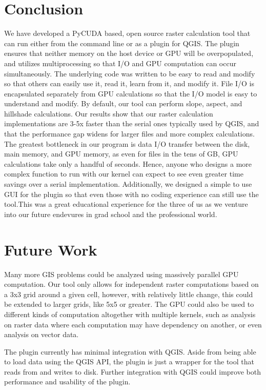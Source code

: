 \documentclass[journal]{IEEEtran}
\begin{document}
\section{Conclusion}
We have developed a PyCUDA based, open source raster calculation tool that can
run either from the command line or as a plugin for QGIS. The plugin ensures
that neither memory on the host device or GPU will be overpopulated, and
utilizes multiprocessing so that I/O and GPU computation can occur
simultaneously. The underlying code was written to be easy to read and modify
so that others can easily use it, read it, learn from it, and modify it. File
I/O is encapsulated separately from GPU calculations so that the I/O model is
easy to understand and modify. By default, our tool can perform slope, aspect,
and hillshade calculations. Our results show that our raster calculation
implementations are 3-5x faster than the serial ones typically used by QGIS, and
that the performance gap widens for larger files and more complex calculations.
The greatest bottleneck in our program is data I/O transfer between the disk,
main memory, and GPU memory, as even for files in the tens of GB, GPU
calculations take only a handful of seconds.  Hence, anyone who designs a more
complex function to run with our kernel can expect to see even greater time
savings over a serial implementation. Additionally, we designed a simple to use
GUI for the plugin so that even those with no coding experience can still use
the tool.This was a great educational experience for the three of us as we 
venture into our future endevures in grad school and the professional world.

\section{Future Work}
Many more GIS problems could be analyzed using massively parallel GPU
computation.  Our tool only allows for independent raster computations based on
a 3x3 grid around a given cell, however, with relatively little change, this
could be extended to larger grids, like 5x5 or greater.  The GPU could also be
used to different kinds of computation altogether with multiple kernels, such
as analysis on raster data where each computation may have dependency on
another, or even analysis on vector data.

The plugin currently has minimal integration with QGIS. Aside from being able
to load data using the QGIS API, the plugin is just a wrapper for the tool
that reads from and writes to disk. Further integration with QGIS could improve
both performance and usability of the plugin.
\end{document}
